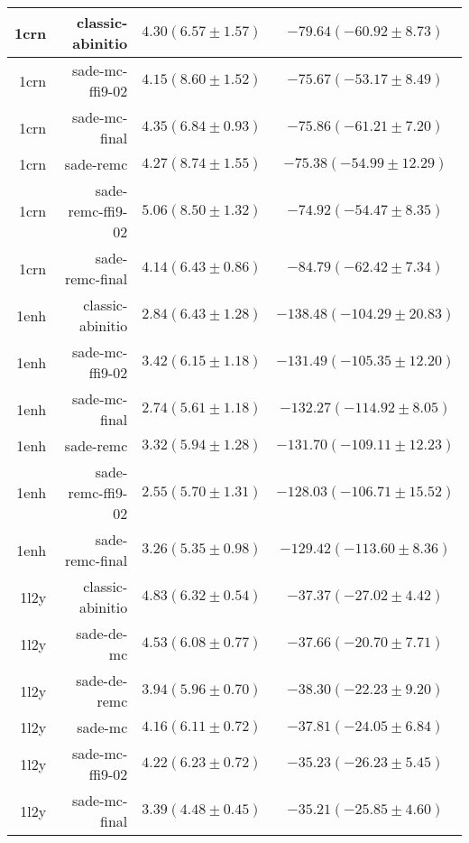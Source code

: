 \begin{table}
\begin{tabular}{r|r|c|c}
        1crn &   classic-abinitio & $4.30 (  6.57 \pm   1.57)$ & $-79.64 (-60.92 \pm   8.73)$ \\ \hline
        1crn &    sade-mc-ffi9-02 & $4.15 (  8.60 \pm   1.52)$ & $-75.67 (-53.17 \pm   8.49)$ \\ \hline
        1crn &      sade-mc-final & $4.35 (  6.84 \pm   0.93)$ & $-75.86 (-61.21 \pm   7.20)$ \\ \hline
        1crn &          sade-remc & $4.27 (  8.74 \pm   1.55)$ & $-75.38 (-54.99 \pm  12.29)$ \\ \hline
        1crn &  sade-remc-ffi9-02 & $5.06 (  8.50 \pm   1.32)$ & $-74.92 (-54.47 \pm   8.35)$ \\ \hline
        1crn &    sade-remc-final & $4.14 (  6.43 \pm   0.86)$ & $-84.79 (-62.42 \pm   7.34)$ \\ \hline
        \hline
        1enh &   classic-abinitio & $2.84 (  6.43 \pm   1.28)$ & $-138.48 (-104.29 \pm  20.83)$ \\ \hline
        1enh &    sade-mc-ffi9-02 & $3.42 (  6.15 \pm   1.18)$ & $-131.49 (-105.35 \pm  12.20)$ \\ \hline
        1enh &      sade-mc-final & $2.74 (  5.61 \pm   1.18)$ & $-132.27 (-114.92 \pm   8.05)$ \\ \hline
        1enh &          sade-remc & $3.32 (  5.94 \pm   1.28)$ & $-131.70 (-109.11 \pm  12.23)$ \\ \hline
        1enh &  sade-remc-ffi9-02 & $2.55 (  5.70 \pm   1.31)$ & $-128.03 (-106.71 \pm  15.52)$ \\ \hline
        1enh &    sade-remc-final & $3.26 (  5.35 \pm   0.98)$ & $-129.42 (-113.60 \pm   8.36)$ \\ \hline
        \hline
        1l2y &   classic-abinitio & $4.83 (  6.32 \pm   0.54)$ & $-37.37 (-27.02 \pm   4.42)$ \\ \hline
        1l2y &         sade-de-mc & $4.53 (  6.08 \pm   0.77)$ & $-37.66 (-20.70 \pm   7.71)$ \\ \hline
        1l2y &       sade-de-remc & $3.94 (  5.96 \pm   0.70)$ & $-38.30 (-22.23 \pm   9.20)$ \\ \hline
        1l2y &            sade-mc & $4.16 (  6.11 \pm   0.72)$ & $-37.81 (-24.05 \pm   6.84)$ \\ \hline
        1l2y &    sade-mc-ffi9-02 & $4.22 (  6.23 \pm   0.72)$ & $-35.23 (-26.23 \pm   5.45)$ \\ \hline
        1l2y &      sade-mc-final & $3.39 (  4.48 \pm   0.45)$ & $-35.21 (-25.85 \pm   4.60)$ \\ \hline

\end{tabular}
\end{table}
